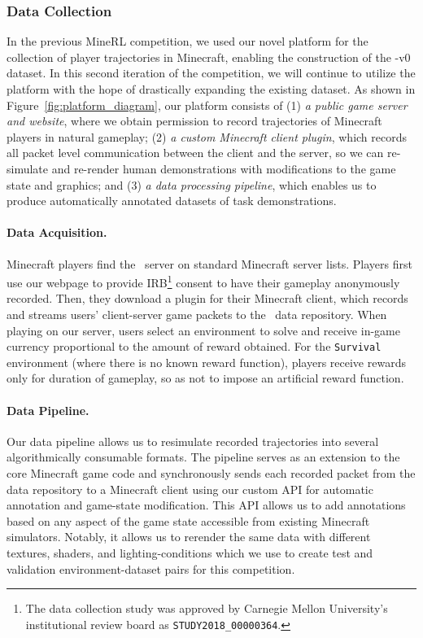\subsubsection{Data Collection}
    In the previous MineRL competition, we used our novel platform for the collection of player trajectories in Minecraft, enabling the construction of the \minenet-v0 dataset.  In this second iteration of the competition, we will continue to utilize the platform with the hope of drastically expanding the existing dataset.
    As shown in Figure~\ref{fig:platform_diagram}, our platform consists of 
    (1) \emph{a public game server and website}, where we obtain permission to record trajectories of Minecraft players in natural gameplay;
    (2) \emph{a custom Minecraft client plugin}, which records all packet level communication between the client and the server, so we can re-simulate and re-render human demonstrations with modifications to the game state and graphics; 
    and (3) \emph{a data processing pipeline}, which enables us to produce automatically annotated datasets of task demonstrations.

    \paragraph{Data Acquisition.}
    Minecraft players find the \minenet~server on standard Minecraft server lists. 
        Players first use our webpage to provide IRB\footnote{The data collection study was approved by Carnegie Mellon University's institutional review board as \texttt{STUDY2018\_00000364}.} consent to have their gameplay anonymously recorded. Then, they download a plugin for their Minecraft client, which records and streams users' client-server game packets to the \minenet~data repository.
    When playing on our server, users select an environment to solve and receive in-game currency proportional to the amount of reward obtained. 
    For the \texttt{Survival} environment (where there is no known reward function), players
receive rewards only for duration of gameplay, so as not to impose an artificial reward function.


        
        
\paragraph{Data Pipeline.}
Our data pipeline allows us to resimulate recorded trajectories into several algorithmically consumable formats. 
    The pipeline serves as an extension to the core Minecraft game code and synchronously sends each recorded packet from the \minenet{} data repository to a Minecraft client using our custom API for automatic annotation and game-state modification. 
    This API allows us to add annotations based on any aspect of the game state accessible from existing Minecraft simulators. 
    Notably, it allows us to rerender the same data with different textures, shaders, and lighting-conditions which we use to create test and validation environment-dataset pairs for this competition.
 
